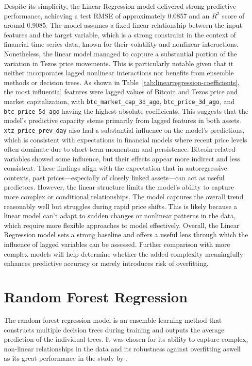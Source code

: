 Despite its simplicity, the Linear Regression model delivered strong predictive performance, achieving a test RMSE of approximately 0.0857 and an $R^2$ score of around 0.9085.
The model assumes a fixed linear relationship between the input features and the target variable, which is a strong constraint in the context of financial time series data, known for their volatility and nonlinear interactions. Nonetheless, the linear model managed to capture a substantial portion of the variation in Tezos price movements. 
This is particularly notable given that it neither incorporates lagged nonlinear interactions nor benefits from ensemble methods or decision trees.
As shown in Table~\ref{tab:linearregression-coefficients}, the most influential features were lagged values of Bitcoin and Tezos price and market capitalization, with \texttt{btc\_market\_cap\_3d\_ago}, \texttt{btc\_price\_3d\_ago}, and \texttt{btc\_price\_5d\_ago} having the highest absolute coefficients. 
This suggests that the model's predictive capacity stems primarily from lagged features in both assets. \texttt{xtz\_price\_prev\_day} also had a substantial influence on the model’s predictions, which is consistent with expectations in financial models where recent price levels often dominate due to short-term momentum and persistence.
Bitcoin-related variables showed some influence, but their effects appear more indirect and less consistent. These findings align with the expectation that in autoregressive contexts, past prices—especially of closely linked assets—can act as useful predictors. However, the linear structure limits the model’s ability to capture more complex or conditional relationships.
The model captures the overall trend reasonably well but struggles during rapid price shifts. This is likely because a linear model can’t adapt to sudden changes or nonlinear patterns in the data, which require more flexible approaches to model effectively.
Overall, the Linear Regression model sets a strong baseline and offers a useful lens through which the influence of lagged variables can be assessed. Further comparison with more complex models will help determine whether the added complexity meaningfully enhances predictive accuracy or merely introduces risk of overfitting.

\section{Random Forest Regression}
The random forest regression model is an ensemble learning method that constructs multiple decision trees during training and outputs the average prediction of the individual trees.
It was chosen for its ability to capture complex, non-linear relationships in the data and its robustness against overfitting aswell as its great performance in the study by \textcite{akyildirim2021prediction} .

